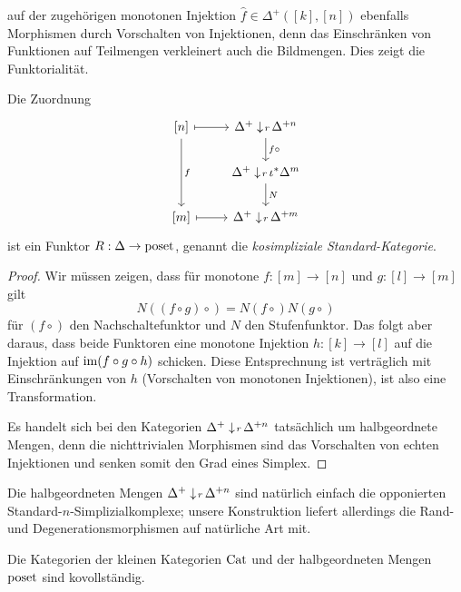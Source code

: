 auf der zugehörigen monotonen Injektion $\hat{f} \in \Delta^+([k],
[n])$ ebenfalls Morphismen durch Vorschalten von Injektionen, denn das
Einschränken von Funktionen auf Teilmengen verkleinert auch die
Bildmengen. Dies zeigt die Funktorialität.
\begin{prop}
  Die Zuordnung
  \[ \begin{tikzcd}
    {[n]} \arrow{dd}{f} \rar[mapsto]
    & \slicecat{\Delta^+}{r}{\Delta^{+n}} \dar{f \circ} \\
    & \slicecat{\Delta^+}{r}{\iota^* \Delta^m} \dar{N} \\
    {[m]} \rar[mapsto]
    & \slicecat{\Delta^+}{r}{\Delta^{+m}}
  \end{tikzcd} \]
  ist ein Funktor $R: \Delta \to \operatorname{poset}$, genannt die
  \emph{kosimpliziale Standard-Kategorie}.
\end{prop}
\begin{proof}
  Wir müssen zeigen, dass für monotone $f: [m] \to [n]$ und $g: [l]
  \to [m]$ gilt
  \[ N ((f \circ g)\circ) = N (f \circ) N (g \circ) \]
  für $(f \circ)$ den Nachschaltefunktor und $N$ den
  Stufenfunktor. Das folgt aber daraus, dass beide Funktoren eine
  monotone Injektion $h: [k] \to [l]$ auf die Injektion auf $\operatorname{im} (f
  \circ g \circ h)$ schicken. Diese Entsprechnung ist verträglich mit
  Einschränkungen von $h$ (Vorschalten von monotonen Injektionen), ist
  also eine Transformation.

  Es handelt sich bei den Kategorien
  $\Delta^+ \downarrow \! {\scriptstyle r} \, \Delta^{+n}$ tatsächlich um halbgeordnete
  Mengen, denn die nichttrivialen Morphismen sind das Vorschalten von
  echten Injektionen und senken somit den Grad eines Simplex.
\end{proof}
\begin{bem}
  Die halbgeordneten Mengen $\Delta^+ \downarrow \! {\scriptstyle r} \, \Delta^{+n}$ sind
  natürlich einfach die opponierten Standard-$n$-Simplizialkomplexe;
  unsere Konstruktion liefert allerdings die Rand- und
  Degenerationsmorphismen auf natürliche Art mit.
\end{bem}
\begin{prop} \label{cat-cocomplete}
  Die Kategorien der kleinen Kategorien $\operatorname{Cat}$ und der halbgeordneten
  Mengen $\operatorname{poset}$ sind kovollständig.
\end{prop}

